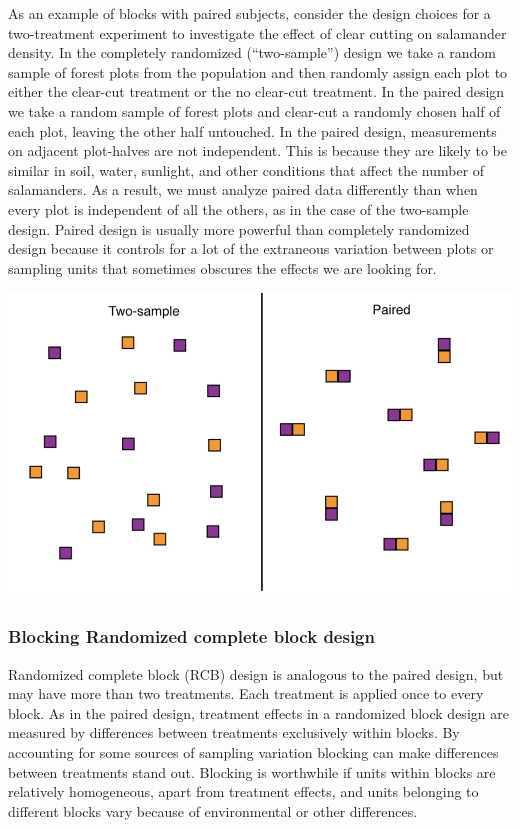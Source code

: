 \documentclass[]{book}
\begin{document}
As an example of blocks with paired subjects, consider the design choices for a two-treatment experiment to investigate the effect of clear cutting on salamander density. In the completely randomized (``two-sample'') design we take a random sample of forest plots from the population and then randomly assign each plot to either the clear-cut treatment or the no clear-cut treatment. In the paired design we take a random sample of forest plots and clear-cut a randomly chosen half of each plot, leaving the other half untouched. In the paired design, measurements on adjacent plot-halves are not independent. This is because they are likely to be similar in soil, water, sunlight, and other conditions that affect the number of salamanders. As a result, we must analyze paired data differently than when every plot is independent of all the others, as in the case of the two-sample design. Paired design is usually more powerful than completely randomized design because it controls for a lot of the extraneous variation between plots or sampling units that sometimes obscures the effects we are looking for.

\begin{center}\includegraphics[width=0.9\linewidth]{images/images_6a.009} \end{center}

\hypertarget{blocking-randomized-complete-block-design}{%
\subsubsection{Blocking \textbar{} Randomized complete block design}\label{blocking-randomized-complete-block-design}}

Randomized complete block (RCB) design is analogous to the paired design, but may have more than two treatments. Each treatment is applied once to every block. As in the paired design, treatment effects in a randomized block design are measured by differences between treatments exclusively within blocks. By accounting for some sources of sampling variation blocking can make differences between treatments stand out. Blocking is worthwhile if units within blocks are relatively homogeneous, apart from treatment effects, and units belonging to different blocks vary because of environmental or other differences.
\end{document}
